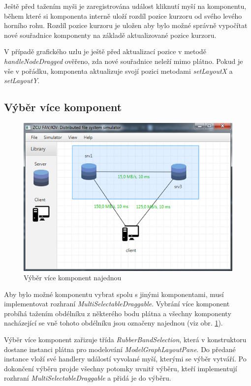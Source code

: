 \documentclass[czech,DP]{thesiskiv}
\begin{document}
Ještě před tažením myši je zaregistrována událost kliknutí myší na komponentu, během které si komponenta interně uloží rozdíl pozice kurzoru od svého levého horního rohu. Rozdíl pozice kurzoru je uložen aby bylo možné správně vypočítat nové souřadnice komponenty na základě aktualizované pozice kurzoru.

V případě grafického uzlu je ještě před aktualizací pozice v metodě \textit{handleNodeDragged} ověřeno, zda nové souřadnice neleží mimo plátno. Pokud je vše v pořádku, komponenta aktualizuje svojí pozici metodami \textit{setLayoutX} a \textit{setLayoutY}.

\subsection{Výběr více komponent}

\begin{figure}
\centering
	\includegraphics{img/multi_selekce.png}
\caption{Výběr více komponent najednou}
\label{fig:selekce_najednou}
\end{figure}

Aby bylo možné komponentu vybrat spolu s jinými komponentami, musí implementovat rozhraní \textit{MultiSelectableDraggable}. Vybrání více komponent probíhá tažením obdélníku z některého bodu plátna a všechny komponenty nacházející se vně tohoto obdélníku jsou označeny najednou (viz obr. \ref{fig:selekce_najednou}).

Výběr více komponent zařizuje třída \textit{RubberBandSelection}, která v konstruktoru dostane instanci plátna pro modelování \textit{ModelGraphLayoutPane}. Do předané instance vloží své handlery událostí vyvolané myší, kterými se výběr vytváří. Po dokončení výběru projde všechny potomky uvnitř výběru, kteří implementují rozhraní \textit{MultiSelectableDraggable} a přidá je do výběru.
\end{document}
